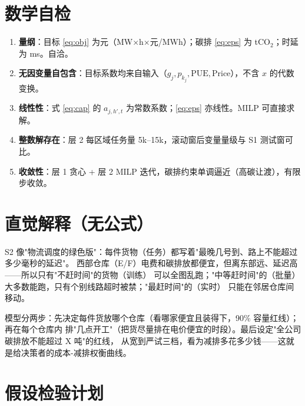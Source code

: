 \documentclass{internal-report}
\begin{document}
\section{数学自检}

\begin{enumerate}
  \item \textbf{量纲}：目标 \eqref{eq:obj} 为元（MW$\times$h$\times$元/MWh）；碳排 \eqref{eq:eps} 为 tCO$_2$；时延为 ms。自洽。
  \item \textbf{无因变量自包含}：目标系数均来自输入（$g_j,p_{k_j},\text{PUE},\text{Price}$），不含 $x$ 的代数变换。
  \item \textbf{线性性}：式 \eqref{eq:cap} 的 $a_{j,h',t}$ 为常数系数；\eqref{eq:eps} 亦线性。MILP 可直接求解。
  \item \textbf{整数解存在}：层 2 每区域任务量 5k--15k，滚动窗后变量量级与 S1 测试窗可比。
  \item \textbf{收敛性}：层 1 贪心 + 层 2 MILP 迭代，碳排约束单调逼近（高碳让渡），有限步收敛。
\end{enumerate}

\section{直觉解释（无公式）}

S2 像"物流调度的绿色版"：每件货物（任务）都写着"最晚几号到、路上不能超过多少毫秒的延迟"。
西部仓库（E/F）电费和碳排放都便宜，但离东部远、延迟高——所以只有"不赶时间"的货物（训练）
可以全图乱跑；"中等赶时间"的（批量）大多数能跑，只有个别线路超时被禁；"最赶时间"的（实时）
只能在邻居仓库间移动。

模型分两步：先决定每件货放哪个仓库（看哪家便宜且装得下，90\% 容量红线）；再在每个仓库内
排"几点开工"（把货尽量排在电价便宜的时段）。最后设定"全公司碳排放不能超过 X 吨"的红线，
从宽到严试三档，看为减排多花多少钱——这就是给决策者的成本-减排权衡曲线。

\section{假设检验计划}
\end{document}
